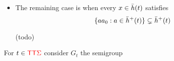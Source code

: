 \begin{itemize}
    \item The remaining case is when every $x \in \bar h(t)$ satisfies 
     \begin{align*}
        \{ a a_0 :  a \in \bar h^+(t)\} \subsetneq  \bar h^+(t)
   \end{align*}
   
   \begin{center}
       (todo)
   \end{center}
\end{itemize}

For $t \in {\color{red}{\mathsf T}} {\color{red}{\mathsf T}} {\color{red}{\Sigma}}$ consider $G_t$ the semigroup
